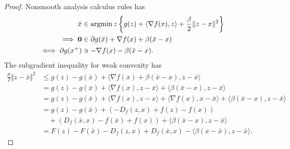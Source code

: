 \documentclass[12pt]{report}
\begin{document}
    \begin{proof}
        Nonsmooth analysis calculus rules has 
        \begin{align*}
            \bar x &\in \mathop{\rm argmin}\limits{z} \left\lbrace
                g(z) + \langle \nabla f(x), z\rangle + \frac{\beta}{2}\Vert z - x\Vert^2
            \right\rbrace
            \\
            \implies
            \mathbf 0 
            &\in \partial g(\bar x) + \nabla f(x) + \beta(\bar x - x)
            \\
            \iff 
            \partial g(x^+) &\ni
            - \nabla f(x) - \beta(\bar x - x). 
        \end{align*}
        The subgradient inequality for weak convexity has 
        \begin{align*}
            \frac{\mu}{2}\Vert z - \bar x\Vert^2 
            &\le 
            g(z) - g(\bar x) + \langle \nabla f(x) + \beta(\bar x - x), z - \bar x\rangle
            \\
            &= 
            g(z) - g(\bar x) + \langle \nabla f(x), z - \bar x\rangle + \langle \beta(\bar x - x), z - \bar x\rangle
            \\
            &= g(z) - g(\bar x) + \langle \nabla f(x), z - x\rangle
            + \langle \nabla f(x), x - \bar x\rangle
            + \langle \beta(\bar x - x), z - \bar x\rangle
            \\
            &= 
            g(z) - g(\bar x) 
            + (-D_f(z, x) + f(z) - f(x))
            \\
            & \quad 
            + (D_f(\bar x, x) - f(\bar x) + f(x))
            + \langle \beta(\bar x - x), z - \bar x\rangle
            \\
            &= F(z) - F(\bar x) - D_f(z, x) + D_f(\bar x, x) 
            - \langle \beta(x - \bar x), z - \bar x\rangle. 
        \end{align*}
    \end{proof}
\end{document}
